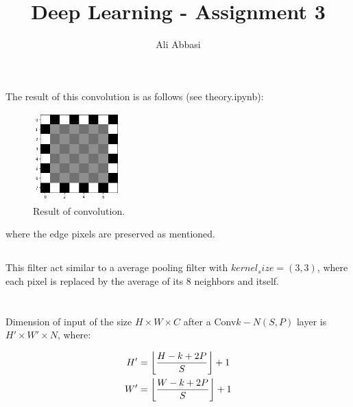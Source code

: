 \documentclass{article}
\title{Deep Learning - Assignment 3}
\author{Ali Abbasi}
\numberwithin{equation}{section}
\DeclarePairedDelimiter\floor{\lfloor}{\rfloor}
\begin{document}
\maketitle

\section{}
\subsection{}
The result of this convolution is as follows (see theory.ipynb):
\begin{figure}[H]
\centering
\includegraphics[width=0.3\textwidth]{theory-1.png}
\caption{Result of convolution.}
\end{figure}
where the edge pixels are preserved as mentioned.
\subsection{}
This filter act similar to a average pooling filter with \(kernel_size=(3, 3)\), where each pixel is replaced by the average of its 8 neighbors and itself.

\section{}
Dimension of input of the size \(H \times W \times C\) after a Conv\(k-N(S, P)\) layer is \(H' \times W' \times N\), where:

\begin{align}
H' &= \floor*{\frac{H - k + 2P}{S}} + 1 \\
W' &= \floor*{\frac{W - k + 2P}{S}} + 1
\end{align}
\end{document}
